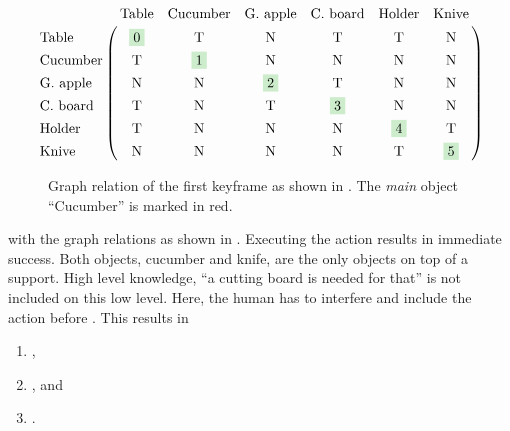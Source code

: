 \begin{align*}
  \bordermatrix{
                      & \textup{Table}        & \textup{Cucumber}     & \textup{G. apple}     & \textup{C. board}     & \textup{Holder}       & \textup{Knive}\cr
    \textup{Table}    & \colorbox{green120}{0}& \textup{T}            & \textup{N}            & \textup{T}            & \textup{T}            & \textup{N}\cr
    \textup{Cucumber} & \textup{T}            & \colorbox{green120}{1}& \textup{N}            & \textup{N}            & \textup{N}            & \textup{N}\cr
    \textup{G. apple} & \textup{N}            & \textup{N}            & \colorbox{green120}{2}& \textup{T}            & \textup{N}            & \textup{N}\cr
    \textup{C. board} & \textup{T}            & \textup{N}            & \textup{T}            & \colorbox{green120}{3}& \textup{N}            & \textup{N}\cr
    \textup{Holder}   & \textup{T}            & \textup{N}            & \textup{N}            & \textup{N}            & \colorbox{green120}{4}& \textup{T}\cr
    \textup{Knive}    & \textup{N}            & \textup{N}            & \textup{N}            & \textup{N}            & \textup{T}            & \colorbox{green120}{5}\cr
  }
\end{align*}

\begin{figure}[]
  \centering
  
  \caption{Graph relation of the first keyframe as shown in . The \emph{main} object ``Cucumber'' is marked in red.}
  \label{fig:sec_usingaffordanceforplanning_results_scenario4_graph1}
\end{figure}

with the graph relations as shown in .
Executing the action  results in immediate success.
Both objects, cucumber and knife, are the only objects on top of a support.
High level knowledge, \ie ``a cutting board is needed for that'' is not included on this low level. 
Here, the human has to interfere and include the action  before .
This results in

\begin{enumerate}
  \item {},
  \item {}, and
  \item {}.
\end{enumerate}


